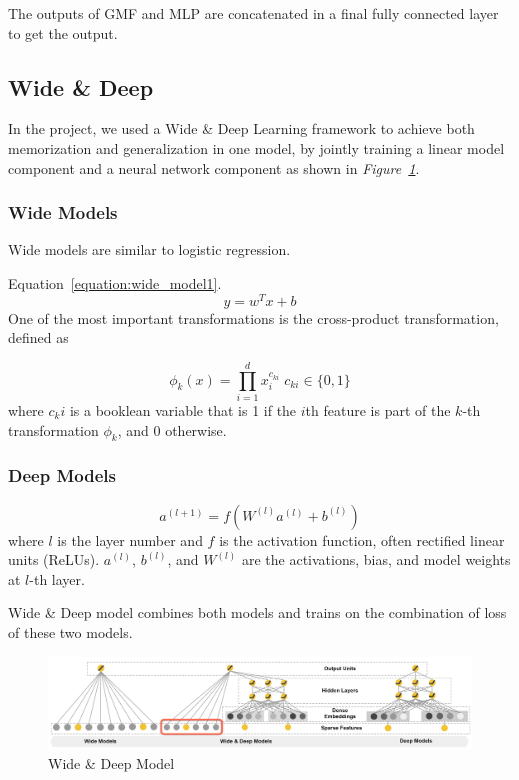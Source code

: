 \documentclass[journal]{IEEEtran}
\begin{document}
The outputs of GMF and MLP are concatenated in a final fully connected layer to get the output.


\subsection{Wide \& Deep}
In the project, we used a Wide \& Deep Learning framework to achieve both memorization and generalization in one model, by jointly training a linear model component and a
neural network component as shown in {\it Figure~\ref{fig:wide_deep}}.  

\subsubsection{Wide Models}
Wide models are similar to logistic regression.

Equation~\ref{equation:wide_model1}. 
\begin{equation}
    y = w^Tx + b
    \label{equation:wide_model1}
\end{equation}
One of the most important transformations is the cross-product transformation, defined as 

\begin{equation}
    \phi_k(x) = \prod_{i=1}^{d} x_i^{c_{ki}} \; c_{ki} \in \{0, 1\}
    \label{equation:wide_model2}
\end{equation}
where $c_ki$ is a booklean variable that is 1 if the $i$th feature is part of the $k$-th transformation $\phi_k$, and 0 otherwise.

\subsubsection{Deep Models}

\begin{equation}
    a^{(l+1)} = f(W^{(l)}a^{(l)}+b^{(l)})
    \label{equation:deep_model}
\end{equation}
where $l$ is the layer number and $f$ is the activation function, often rectified linear units (ReLUs). $a^{(l)}$, $b^{(l)}$, and $W^{(l)}$ are the activations, bias, and model weights at $l$-th layer.

Wide \& Deep model combines both models and trains on the combination of loss of these two models.

\begin{figure}
 \center
  \includegraphics[width=\textwidth]{images/wide_deep.png}
  \caption{Wide \& Deep Model}
  \label{fig:wide_deep}
\end{figure}
\end{document}
